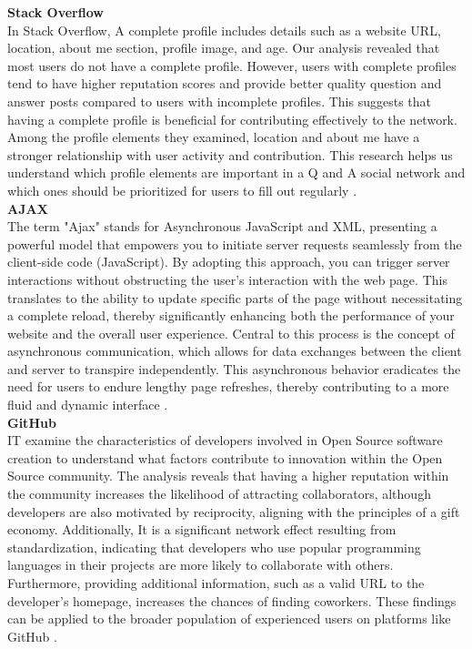 \textbf{Stack Overflow}\\
In Stack Overflow, A complete profile includes details such as a website URL, location, about me section, profile image, and age. Our analysis revealed that most users do not have a complete profile. However, users with complete profiles tend to have higher reputation scores and provide better quality question and answer posts compared to users with incomplete profiles. This suggests that having a complete profile is beneficial for contributing effectively to the network. Among the profile elements they examined, location and about me have a stronger relationship with user activity and contribution. This research helps us understand which profile elements are important in a Q and A social network and which ones should be prioritized for users to fill out regularly \cite{adaji2016towards}.\\
\textbf{AJAX}\\
The term "Ajax" stands for Asynchronous JavaScript and XML, presenting a powerful model that empowers you to initiate server requests seamlessly from the client-side code (JavaScript). By adopting this approach, you can trigger server interactions without obstructing the user's interaction with the web page. This translates to the ability to update specific parts of the page without necessitating a complete reload, thereby significantly enhancing both the performance of your website and the overall user experience. Central to this process is the concept of asynchronous communication, which allows for data exchanges between the client and server to transpire independently. This asynchronous behavior eradicates the need for users to endure lengthy page refreshes, thereby contributing to a more fluid and dynamic interface \cite{paz2013ajax}.\\
\textbf{GitHub}\\
IT examine the characteristics of developers involved in Open Source software creation to understand what factors contribute to innovation within the Open Source community. The analysis reveals that having a higher reputation within the community increases the likelihood of attracting collaborators, although developers are also motivated by reciprocity, aligning with the principles of a gift economy. Additionally, It is a significant network effect resulting from standardization, indicating that developers who use popular programming languages in their projects are more likely to collaborate with others. Furthermore, providing additional information, such as a valid URL to the developer's homepage, increases the chances of finding coworkers. These findings can be applied to the broader population of experienced users on platforms like GitHub \cite{celinska2018coding}.\\
